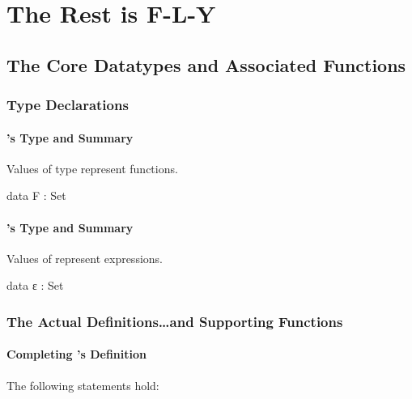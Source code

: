 \documentclass{report}
\begin{document}
\part{The Rest is F-L-Y}

\chapter{The Core Datatypes and Associated Functions}

\section{Type Declarations}

\subsection{'s Type and Summary}
Values of type  represent functions.

\begin{code}
data F : Set
\end{code}

\subsection{'s Type and Summary}
Values of  represent expressions.

\begin{code}
data ε : Set
\end{code}

\section{The Actual Definitions\ldots and Supporting Functions}

\subsection{Completing 's Definition}
The following statements hold:
\end{document}
